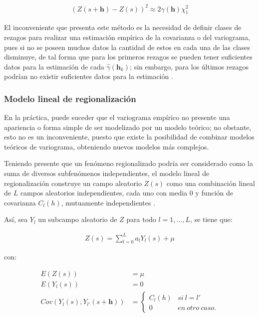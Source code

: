 \documentclass[
]{book}
\begin{document}
\begin{align}
  (Z(s+\textbf{h})-Z(s))^2\approx 2\gamma(\textbf{h})\chi_1^2   
\end{align}

El inconveniente que presenta este método es la necesidad de definir clases de rezagos para realizar una estimación empírica de la covarianza o del variograma, pues si no se poseen muchos datos la cantidad de estos en cada una de las clases disminuye, de tal forma que para los primeros rezagos se pueden tener suficientes datos para la estimación de cada \(\hat{\gamma}(\textbf{h}_k)\); sin embargo, para los últimos rezagos podrían no existir suficientes datos para la estimación \citep{marta}.

\hypertarget{modelo-lineal-de-regionalizaciuxf3n}{%
\subsubsection*{Modelo lineal de regionalización}\label{modelo-lineal-de-regionalizaciuxf3n}}

En la práctica, puede suceder que el variograma empírico no presente una apariencia o forma simple de ser modelizado por un modelo teórico; no obstante, esto no es un inconveniente, puesto que existe la posibilidad de combinar modelos teóricos de variograma, obteniendo nuevos modelos más complejos.

Teniendo presente que un fenómeno regionalizado podría ser considerado como la suma de diversos subfenómenos independientes, el modelo lineal de regionalización construye un campo aleatorio \(Z(s)\) como una combinación lineal de \(L\) campos aleatorios independientes, cada uno con media 0 y función de covarianza \(C_l(h)\), mutuamente independientes \citep{marta}.

Así, sea \(Y_l\) un subcampo aleatorio de \(Z\) para todo \(l=1,...,L\), se tiene que:

\begin{align}
  Z(s)=\sum_{l=0}^{L}a_lY_l(s)+\mu
\end{align}

con:

\begin{align}
    E(Z(s))&=\mu\\
    E(Y_l(s))&=0\\
    Cov(Y_l(s),Y_{l'}(s+\textbf{h}))&= \left \{ \begin{matrix} C_l(h) & si \ l=l'
\\ 0 & en\ otro\ caso.
\end{matrix}\right.  
\end{align}
\end{document}
